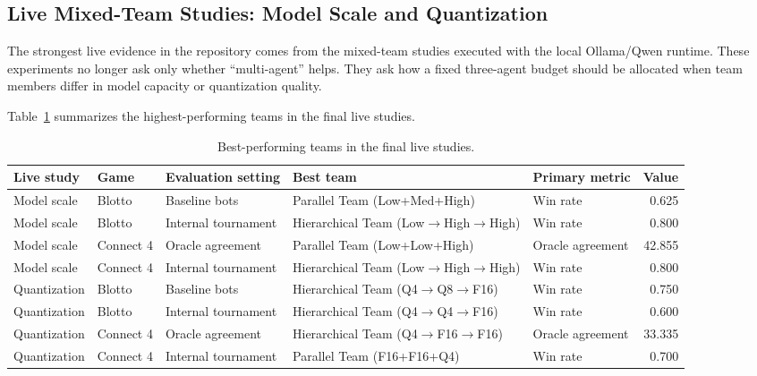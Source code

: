 \documentclass[11pt]{article}
\begin{document}
\subsection{Live Mixed-Team Studies: Model Scale and Quantization}
The strongest live evidence in the repository comes from the mixed-team studies executed with the local Ollama/Qwen runtime. These experiments no longer ask only whether ``multi-agent'' helps. They ask how a fixed three-agent budget should be allocated when team members differ in model capacity or quantization quality.

Table~\ref{tab:live-topline} summarizes the highest-performing teams in the final live studies.

\begin{table}[H]
\centering
\caption{Best-performing teams in the final live studies.}
\label{tab:live-topline}
\begin{adjustbox}{width=\textwidth}
\begin{tabular}{@{}lllllr@{}}
\toprule
Live study & Game & Evaluation setting & Best team & Primary metric & Value \\
\midrule
Model scale & Blotto & Baseline bots & Parallel Team (Low+Med+High) & Win rate & 0.625 \\
Model scale & Blotto & Internal tournament & Hierarchical Team (Low$\rightarrow$High$\rightarrow$High) & Win rate & 0.800 \\
Model scale & Connect 4 & Oracle agreement & Parallel Team (Low+Low+High) & Oracle agreement & 42.855 \\
Model scale & Connect 4 & Internal tournament & Hierarchical Team (Low$\rightarrow$High$\rightarrow$High) & Win rate & 0.800 \\
Quantization & Blotto & Baseline bots & Hierarchical Team (Q4$\rightarrow$Q8$\rightarrow$F16) & Win rate & 0.750 \\
Quantization & Blotto & Internal tournament & Hierarchical Team (Q4$\rightarrow$Q4$\rightarrow$F16) & Win rate & 0.600 \\
Quantization & Connect 4 & Oracle agreement & Hierarchical Team (Q4$\rightarrow$F16$\rightarrow$F16) & Oracle agreement & 33.335 \\
Quantization & Connect 4 & Internal tournament & Parallel Team (F16+F16+Q4) & Win rate & 0.700 \\
\bottomrule
\end{tabular}
\end{adjustbox}
\end{table}
\end{document}
